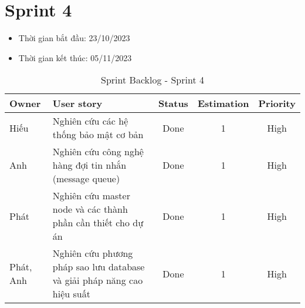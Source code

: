 \section{Sprint 4}
\begin{itemize}
    \item Thời gian bắt đầu: 23/10/2023
    \item Thời gian kết thúc: 05/11/2023
\end{itemize}
\begin{table}[H]
    \begin{tabular}{|m{2.5cm}|m{6cm}|c|c|c|}
    \hline
    \textbf{Owner}  & \textbf{User story}                                & \textbf{Status} & \textbf{Estimation} & \textbf{Priority} \\ \hline
    Hiếu                & Nghiên cứu các hệ thống bảo mật cơ bản                      & Done            & 1                   & High           \\ \hline
    Anh                 & Nghiên cứu công nghệ hàng đợi tin nhắn (message queue)                       & Done            & 1                   & High           \\ \hline
    Phát                & Nghiên cứu master node và các thành phần cần thiết cho dự án                      & Done            & 1                   & High           \\ \hline
    Phát, Anh                & Nghiên cứu phương pháp sao lưu database và giải pháp năng cao hiệu suất                      & Done            & 1                   & High           \\ \hline
    \end{tabular}
    \caption{Sprint Backlog - Sprint 4}
    \label{tab:sprint-4}
\end{table}
